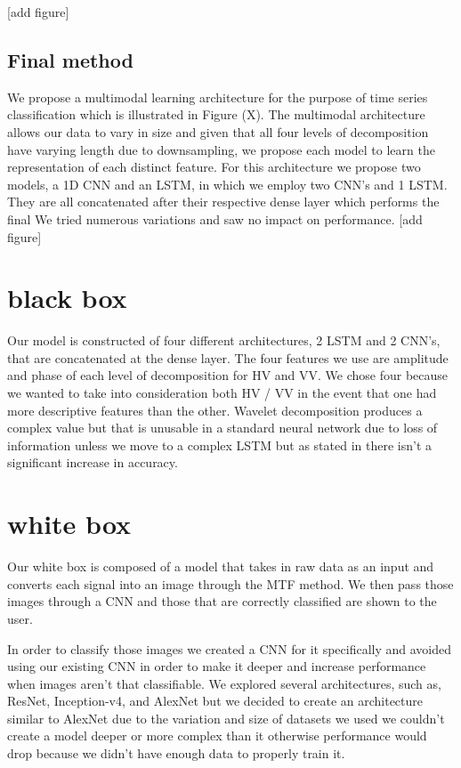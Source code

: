 \documentclass{turabian-thesis}
\begin{document}
[add figure]

\subsection{Final method}
We propose a multimodal learning architecture for the purpose of time series classification which is illustrated in Figure (X). The multimodal architecture allows our data to vary in size and given that all four levels of decomposition have varying length due to downsampling, we propose each model to learn the representation of each distinct feature. For this architecture we propose two models, a 1D CNN and an LSTM, in which we employ two CNN’s and 1 LSTM. They are all concatenated after their respective dense layer which performs the final   We tried numerous variations and saw no impact on performance. 
[add figure]


\section{black box}
Our model is constructed of four different architectures, 2 LSTM and 2 CNN’s, that are concatenated at the dense layer. The four features we use are amplitude and phase of each level of decomposition for HV and VV. We chose four because we wanted to take into consideration both HV / VV in the event that one had more descriptive features than the other. Wavelet decomposition produces a complex value but that is unusable in a standard neural network due to loss of information unless we move to a complex LSTM but as stated in {} there isn’t a significant increase in accuracy. 

\section{white box}
Our white box is composed of a model that takes in raw data as an input and converts each signal into an image through the MTF method. We then pass those images through a CNN and those that are correctly classified are shown to the user.

In order to classify those images we created a CNN for it specifically and avoided using our existing CNN in order to make it deeper and increase performance when images aren’t that classifiable. We explored several architectures, such as, ResNet, Inception-v4, and AlexNet but we decided to create an architecture similar to AlexNet due to the variation and size of datasets we used we couldn’t create a model deeper or more complex than it otherwise performance would drop because we didn’t have enough data to properly train it.
\end{document}
